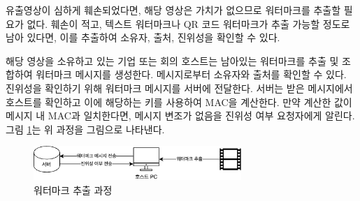 유출영상이 심하게 훼손되었다면, 해당 영상은 가치가 없으므로 워터마크를 추출할
필요가 없다. 훼손이 적고, 텍스트 워터마크나 QR 코드 워터마크가 추출 가능할
정도로 남아 있다면, 이를 추출하여 소유자, 출처, 진위성을 확인할 수 있다.

해당 영상을 소유하고 있는 기업 또는 회의 호스트는 남아있는 워터마크를 추출 및
조합하여 워터마크 메시지를 생성한다. 메시지로부터 소유자와 출처를 확인할 수
있다. 진위성을 확인하기 위해 워터마크 메시지를 서버에 전달한다. 서버는 받은
메시지에서 호스트를 확인하고 이에 해당하는 키를 사용하여 MAC을 계산한다. 만약
계산한 값이 메시지 내 MAC과 일치한다면, 메시지 변조가 없음을 진위성 여부
요청자에게 알린다. 그림 \ref{fig:wm_decoding}는 위 과정을 그림으로 나타낸다.
\begin{figure}[ht]
    \vspace{10pt}
    \centering
    \includegraphics[width=0.7\textwidth]{imgs/wm_decoding.png}
    \caption{워터마크 추출 과정}
    \label{fig:wm_decoding}
\end{figure}